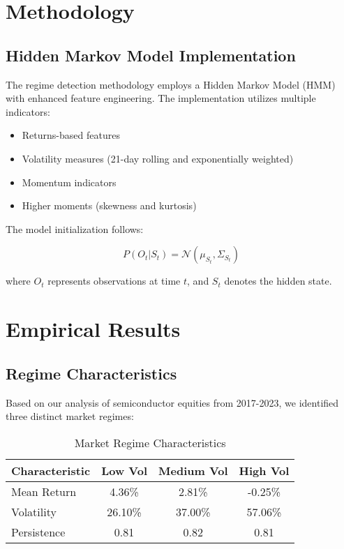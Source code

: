 \section{Methodology}
\subsection{Hidden Markov Model Implementation}
The regime detection methodology employs a Hidden Markov Model (HMM) with enhanced feature engineering. The implementation utilizes multiple indicators:

\begin{itemize}
    \item Returns-based features
    \item Volatility measures (21-day rolling and exponentially weighted)
    \item Momentum indicators
    \item Higher moments (skewness and kurtosis)
\end{itemize}

The model initialization follows:

\begin{equation}
    P(O_t|S_t) = \mathcal{N}(\mu_{S_t}, \Sigma_{S_t})
\end{equation}

where $O_t$ represents observations at time $t$, and $S_t$ denotes the hidden state.

\section{Empirical Results}
\subsection{Regime Characteristics}

Based on our analysis of semiconductor equities from 2017-2023, we identified three distinct market regimes:

\begin{table}[h]
\centering
\begin{tabular}{lccc}
\hline
Characteristic & Low Vol & Medium Vol & High Vol \\
\hline
Mean Return & 4.36\% & 2.81\% & -0.25\% \\
Volatility & 26.10\% & 37.00\% & 57.06\% \\
Persistence & 0.81 & 0.82 & 0.81 \\
\hline
\end{tabular}
\caption{Market Regime Characteristics}
\label{tab:regime_chars}
\end{table}

